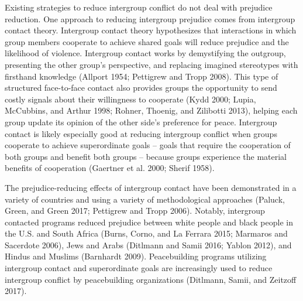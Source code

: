 \documentclass[11pt]{article}
\begin{document}
Existing strategies to reduce intergroup conflict do not deal with
prejudice reduction. One approach to reducing intergroup prejudice comes
from intergroup contact theory. Intergroup contact theory hypothesizes
that interactions in which group members cooperate to achieve shared
goals will reduce prejudice and the likelihood of violence. Intergroup
contact works by demystifying the outgroup, presenting the other group's
perspective, and replacing imagined stereotypes with firsthand knowledge
(Allport 1954; Pettigrew and Tropp 2008). This type of structured
face-to-face contact also provides groups the opportunity to send costly
signals about their willingness to cooperate (Kydd 2000; Lupia,
McCubbins, and Arthur 1998; Rohner, Thoenig, and Zilibotti 2013),
helping each group update its opinion of the other side's preference for
peace. Intergroup contact is likely especially good at reducing
intergroup conflict when groups cooperate to achieve superordinate goals
-- goals that require the cooperation of both groups and benefit both
groups -- because groups experience the material benefits of cooperation
(Gaertner et al. 2000; Sherif 1958).

The prejudice-reducing effects of intergroup contact have been
demonstrated in a variety of countries and using a variety of
methodological approaches (Paluck, Green, and Green 2017; Pettigrew and
Tropp 2006). Notably, intergroup contacted programs reduced prejudice
between white people and black people in the U.S. and South Africa
(Burns, Corno, and La Ferrara 2015; Marmaros and Sacerdote 2006), Jews
and Arabs (Ditlmann and Samii 2016; Yablon 2012), and Hindus and Muslims
(Barnhardt 2009). Peacebuilding programs utilizing intergroup contact
and superordinate goals are increasingly used to reduce intergroup
conflict by peacebuilding organizations (Ditlmann, Samii, and Zeitzoff
2017).
\end{document}
